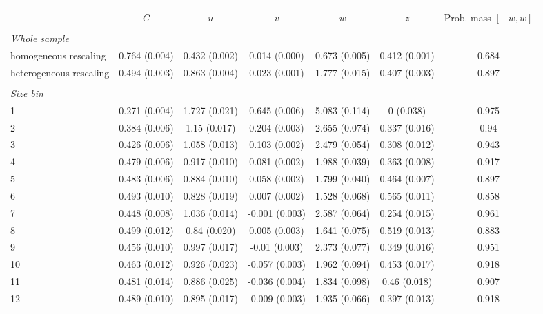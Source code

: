 
\begin{tabular}{@{\extracolsep{5pt}} l cccccc} 
\\[-1.8ex]\hline 
\hline \\[-1.8ex] 
 & $C$ & $u$ & $v$ & $w$ & $z$ & Prob. mass $[-w,w]$ \\ 
\hline \\[-1.8ex] 
\underline{{\it Whole sample}} &   &   &   &   &   &  \\ 
homogeneous rescaling & 0.764 (0.004) & 0.432 (0.002) & 0.014 (0.000) & 0.673 (0.005) & 0.412 (0.001) & 0.684 \\ 
heterogeneous rescaling & 0.494 (0.003) & 0.863 (0.004) & 0.023 (0.001) & 1.777 (0.015) & 0.407 (0.003) & 0.897 \\ 
 &   &   &   &   &   &  \\ 
\underline{{\it Size bin}} &   &   &   &   &   &  \\ 
1 & 0.271 (0.004) & 1.727 (0.021) & 0.645 (0.006) & 5.083 (0.114) & 0 (0.038) & 0.975 \\ 
2 & 0.384 (0.006) & 1.15 (0.017) & 0.204 (0.003) & 2.655 (0.074) & 0.337 (0.016) & 0.94 \\ 
3 & 0.426 (0.006) & 1.058 (0.013) & 0.103 (0.002) & 2.479 (0.054) & 0.308 (0.012) & 0.943 \\ 
4 & 0.479 (0.006) & 0.917 (0.010) & 0.081 (0.002) & 1.988 (0.039) & 0.363 (0.008) & 0.917 \\ 
5 & 0.483 (0.006) & 0.884 (0.010) & 0.058 (0.002) & 1.799 (0.040) & 0.464 (0.007) & 0.897 \\ 
6 & 0.493 (0.010) & 0.828 (0.019) & 0.007 (0.002) & 1.528 (0.068) & 0.565 (0.011) & 0.858 \\ 
7 & 0.448 (0.008) & 1.036 (0.014) & -0.001 (0.003) & 2.587 (0.064) & 0.254 (0.015) & 0.961 \\ 
8 & 0.499 (0.012) & 0.84 (0.020) & 0.005 (0.003) & 1.641 (0.075) & 0.519 (0.013) & 0.883 \\ 
9 & 0.456 (0.010) & 0.997 (0.017) & -0.01 (0.003) & 2.373 (0.077) & 0.349 (0.016) & 0.951 \\ 
10 & 0.463 (0.012) & 0.926 (0.023) & -0.057 (0.003) & 1.962 (0.094) & 0.453 (0.017) & 0.918 \\ 
11 & 0.481 (0.014) & 0.886 (0.025) & -0.036 (0.004) & 1.834 (0.098) & 0.46 (0.018) & 0.907 \\ 
12 & 0.489 (0.010) & 0.895 (0.017) & -0.009 (0.003) & 1.935 (0.066) & 0.397 (0.013) & 0.918 \\ 

\end{tabular}
